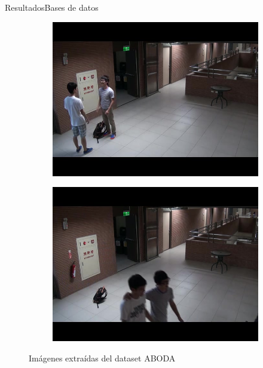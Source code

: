 \begin{frame}{Resultados}{Bases de datos}
\begin{figure}[ht]
  \centering
  \begin{subfigure}[b]{0.3\textwidth}
    \includegraphics[width=\textwidth]{Images/resultados/datasets/aboda_1.jpg}
    \caption{}
    \label{fig:aboda_1}
  \end{subfigure}
  \qquad
  \begin{subfigure}[b]{0.3\textwidth}
    \includegraphics[width=\textwidth]{Images/resultados/datasets/aboda_2.jpg}
    \caption{}
    \label{fig:aboda_2}
  \end{subfigure}
  \caption{Imágenes extraídas del dataset ABODA}
  \label{fig:aboda}
\end{figure}
    
\end{frame}


